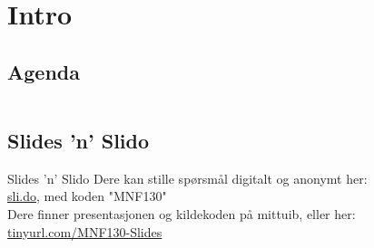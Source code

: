 \begin{frame}[t,plain]
    \titlepage
\end{frame}

\section*{Intro}
\subsection*{Agenda}
\begin{frame}
    \begin{columns}[t]
        \begin{column}{.5\textwidth}
            \tableofcontents[sections={1-4}]
        \end{column}
        \begin{column}{.5\textwidth}
            \tableofcontents[sections={5-}]
        \end{column}
    \end{columns}
\end{frame}

\subsection*{Slides 'n' Slido}
\begin{frame}{Slides 'n' Slido}
    Dere kan stille spørsmål digitalt og anonymt her:\\
    \url{sli.do}, med koden "MNF130"\\

    Dere finner presentasjonen og kildekoden på mittuib, eller her:\\
    \url{tinyurl.com/MNF130-Slides}
\end{frame}